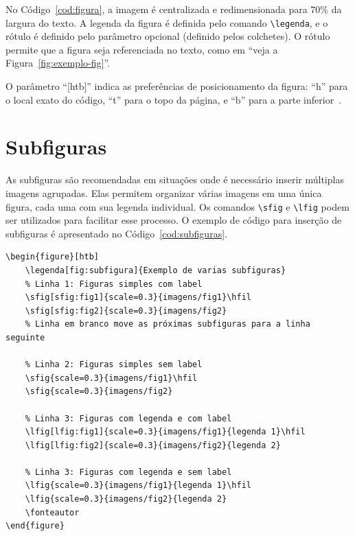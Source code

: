No Código~\ref{cod:figura}, a imagem é centralizada e redimensionada para 70\% da largura do texto. A legenda da figura é definida pelo comando \texttt{\textbackslash legenda}, e o rótulo é definido pelo parâmetro opcional (definido pelos colchetes). O rótulo permite que a figura seja referenciada no texto, como em ``veja a Figura~\ref{fig:exemplo-fig}''.

O parâmetro ``[htb]'' indica as preferências de posicionamento da figura: ``h'' para o local exato do código, ``t'' para o topo da página, e ``b'' para a parte inferior~\cite{goossens1997latex}.

\section{Subfiguras}
\label{sec:subfiguras}

As subfiguras são recomendadas em situações onde é necessário inserir múltiplas imagens agrupadas. Elas permitem organizar várias imagens em uma única figura, cada uma com sua legenda individual. Os comandos \texttt{\textbackslash sfig} e \texttt{\textbackslash lfig} podem ser utilizados para facilitar esse processo. O exemplo de código para inserção de subfiguras é apresentado no Código~\ref{cod:subfiguras}.

\begin{codigo}[htb]
\begin{lstlisting}
\begin{figure}[htb]
    \legenda[fig:subfigura]{Exemplo de varias subfiguras}
    % Linha 1: Figuras simples com label
    \sfig[sfig:fig1]{scale=0.3}{imagens/fig1}\hfil
    \sfig[sfig:fig2]{scale=0.3}{imagens/fig2}
    % Linha em branco move as próximas subfiguras para a linha seguinte

    % Linha 2: Figuras simples sem label
    \sfig{scale=0.3}{imagens/fig1}\hfil
    \sfig{scale=0.3}{imagens/fig2}

    % Linha 3: Figuras com legenda e com label
    \lfig[lfig:fig1]{scale=0.3}{imagens/fig1}{legenda 1}\hfil
    \lfig[lfig:fig2]{scale=0.3}{imagens/fig2}{legenda 2}

    % Linha 3: Figuras com legenda e sem label
    \lfig{scale=0.3}{imagens/fig1}{legenda 1}\hfil
    \lfig{scale=0.3}{imagens/fig2}{legenda 2}
    \fonteautor
\end{figure}
\end{lstlisting}
\fonteautor
\end{codigo}

